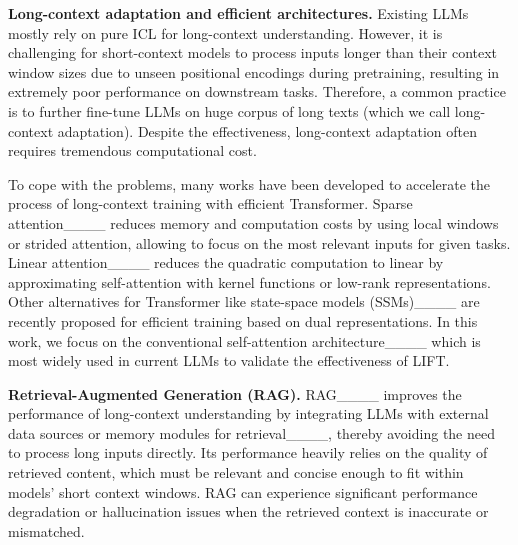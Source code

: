 
\textbf{Long-context adaptation and efficient architectures. } Existing LLMs mostly rely on pure ICL for long-context understanding. However, it is challenging for short-context models to process inputs longer than their context window sizes due to unseen positional encodings during pretraining, resulting in extremely poor performance on downstream tasks. Therefore, a common practice is to further fine-tune LLMs on huge corpus of long texts (which we call long-context adaptation). Despite the effectiveness, long-context adaptation often requires tremendous computational cost.

To cope with the problems, many works have been developed to accelerate the process of long-context training with efficient Transformer. Sparse attention____ reduces memory and computation costs by using local windows or strided attention, allowing to focus on the most relevant inputs for given tasks. Linear attention____ reduces the quadratic computation to linear by approximating self-attention with kernel functions or low-rank representations. Other alternatives for Transformer like state-space models (SSMs)____ are recently proposed for efficient training based on dual representations. In this work, we focus on the conventional self-attention architecture____ which is most widely used in current LLMs to validate the effectiveness of LIFT.

\textbf{Retrieval-Augmented Generation (RAG). } RAG____ improves the performance of long-context understanding by integrating LLMs with external data sources or memory modules for retrieval____, thereby avoiding the need to process long inputs directly. Its performance heavily relies on the quality of retrieved content, which must be relevant and concise enough to fit within models' short context windows. RAG can experience significant performance degradation or hallucination issues when the retrieved context is inaccurate or mismatched.

